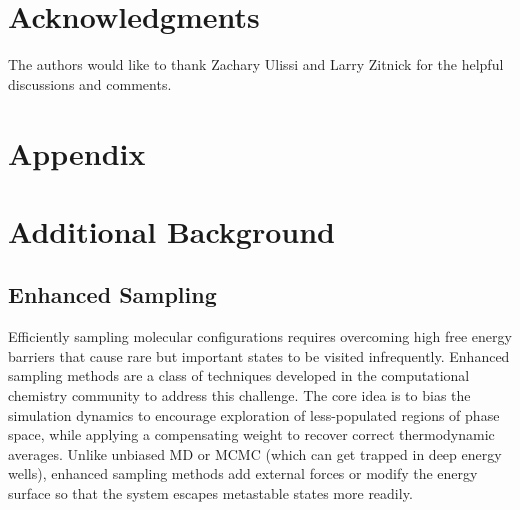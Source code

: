 \documentclass[]{fairmeta}
\theoremstyle{remark}
\begin{document}




\section*{Acknowledgments}

The authors would like to thank Zachary Ulissi and Larry Zitnick for the helpful discussions and comments.






\clearpage
\appendix

{
\setlength{\parskip}{.03cm}
\section*{Appendix}
\startcontents
{}
\vspace{.3cm}
}


\section{Additional Background}

\subsection{Enhanced Sampling}
\label{sec:enhanced_sampling}

Efficiently sampling molecular configurations requires overcoming high free energy barriers that cause rare but important states to be visited infrequently. Enhanced sampling methods are a class of techniques developed in the computational chemistry community to address this challenge. The core idea is to bias the simulation dynamics to encourage exploration of less-populated regions of phase space, while applying a compensating weight to recover correct thermodynamic averages. Unlike unbiased MD or MCMC (which can get trapped in deep energy wells), enhanced sampling methods add external forces or modify the energy surface so that the system escapes metastable states more readily.
\end{document}
